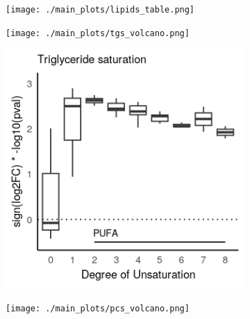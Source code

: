\begin{figure}[ht]
\begin{subfigure}[t]{.3\textwidth}
    \end{subfigure} 
    \begin{subfigure}[t]{.3\textwidth}
        \caption{}
        \texttt{[image: ./main\_plots/lipids\_table.png]}        
    \end{subfigure} 
    \par
    \begin{subfigure}[t]{.29\textwidth}
        \caption{}
        \texttt{[image: ./main\_plots/tgs\_volcano.png]}        
    \end{subfigure} 
    \begin{subfigure}[t]{.2\textwidth}
        \caption{}
        \includegraphics[width=\textwidth]{./main_plots/tg_saturation.png}        
    \end{subfigure} 
    \begin{subfigure}[t]{.29\textwidth}
        \caption{}
        \texttt{[image: ./main\_plots/pcs\_volcano.png]}        
    \end{subfigure} 
    \begin{subfigure}[t]{.2\textwidth}
        \caption{}

\end{subfigure}
\end{figure}

